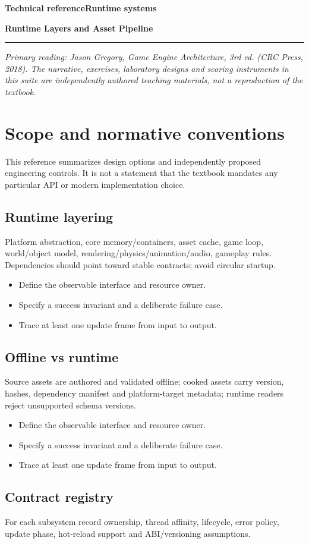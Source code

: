 \documentclass[11pt,letterpaper]{article}
\newcommand{\DocType}{Reference}
\newcommand{\SuiteHeading}[3]{%
\renewcommand{\DocType}{#2}%
{\small\bfseries\sffamily\color{EngineTeal}#2\hfill #3}\par\vspace{6pt}
{\LARGE\bfseries\color{EngineBlue}#1}\par\vspace{4pt}
{\color{EngineTeal}\rule{\linewidth}{1pt}}\par\vspace{7pt}}
\newcommand{\SourceNote}{\footnotesize\textit{Primary reading: Jason Gregory, \emph{Game Engine Architecture}, 3rd ed. (CRC Press, 2018). The narrative, exercises, laboratory designs and scoring instruments in this suite are independently authored teaching materials, not a reproduction of the textbook.}\normalsize\par}
\begin{document}
\SuiteHeading{Runtime Layers and Asset Pipeline}{Technical reference}{Runtime systems}
\SourceNote
\section{Scope and normative conventions}
This reference summarizes design options and independently proposed engineering controls. It is not a statement that the textbook mandates any particular API or modern implementation choice.

\subsection{Runtime layering}
Platform abstraction, core memory/containers, asset cache, game loop, world/object model, rendering/physics/animation/audio, gameplay rules. Dependencies should point toward stable contracts; avoid circular startup.

\begin{itemize}
\item Define the observable interface and resource owner.
\item Specify a success invariant and a deliberate failure case.
\item Trace at least one update frame from input to output.
\end{itemize}
\subsection{Offline vs runtime}
Source assets are authored and validated offline; cooked assets carry version, hashes, dependency manifest and platform-target metadata; runtime readers reject unsupported schema versions.

\begin{itemize}
\item Define the observable interface and resource owner.
\item Specify a success invariant and a deliberate failure case.
\item Trace at least one update frame from input to output.
\end{itemize}
\subsection{Contract registry}
For each subsystem record ownership, thread affinity, lifecycle, error policy, update phase, hot-reload support and ABI/versioning assumptions.
\end{document}
